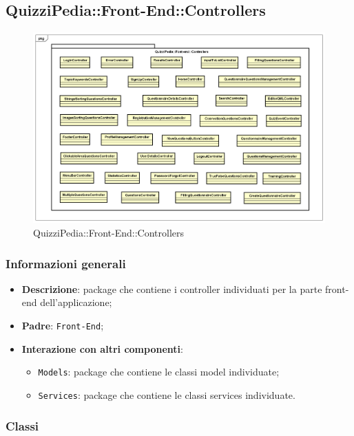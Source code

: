 \newpage
\subsection{QuizziPedia::Front-End::Controllers}


\begin{figure} [ht]
	\centering
	\includegraphics[scale=0.45]{UML/Package/QuizziPedia_Front-End_Controllers.png}
	\caption{QuizziPedia::Front-End::Controllers}
\end{figure} \FloatBarrier

\subsubsection{Informazioni generali}
\begin{itemize}
	\item \textbf{Descrizione}: package che contiene i controller individuati per la parte front-end dell'applicazione;
	\item \textbf{Padre}: \texttt{Front-End};
	\item \textbf{Interazione con altri componenti}:
	\begin{itemize}
		\item \texttt{Models}: package che contiene le classi model individuate;
		\item \texttt{Services}: package che contiene le classi services individuate.
	\end{itemize} 
\end{itemize}
\subsubsection{Classi}

